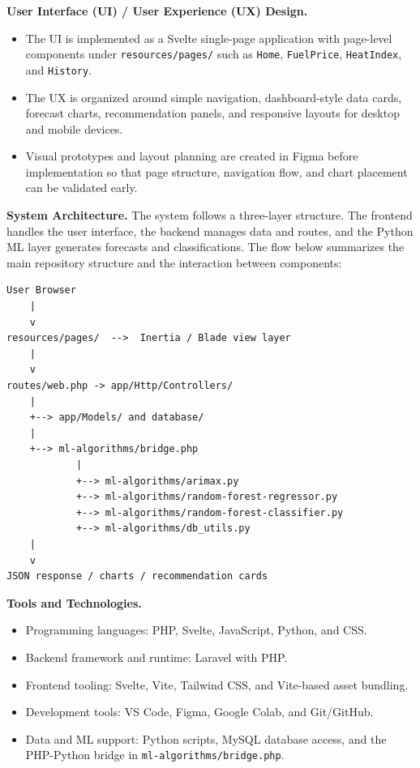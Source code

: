 \documentclass[12pt]{article}
\begin{document}
\medskip
\noindent\textbf{User Interface (UI) / User Experience (UX) Design.}
\begin{itemize}
    \item The UI is implemented as a Svelte single-page application with page-level components under \texttt{resources/pages/} such as \texttt{Home}, \texttt{FuelPrice}, \texttt{HeatIndex}, and \texttt{History}.
    \item The UX is organized around simple navigation, dashboard-style data cards, forecast charts, recommendation panels, and responsive layouts for desktop and mobile devices.
    \item Visual prototypes and layout planning are created in Figma before implementation so that page structure, navigation flow, and chart placement can be validated early.
\end{itemize}

\medskip
\noindent\textbf{System Architecture.} The system follows a three-layer structure. The frontend handles the user interface, the backend manages data and routes, and the Python ML layer generates forecasts and classifications. The flow below summarizes the main repository structure and the interaction between components:

\newpage
\begin{verbatim}
User Browser
    |
    v
resources/pages/  -->  Inertia / Blade view layer
    |
    v
routes/web.php -> app/Http/Controllers/
    |
    +--> app/Models/ and database/
    |
    +--> ml-algorithms/bridge.php
            |
            +--> ml-algorithms/arimax.py
            +--> ml-algorithms/random-forest-regressor.py
            +--> ml-algorithms/random-forest-classifier.py
            +--> ml-algorithms/db_utils.py
    |
    v
JSON response / charts / recommendation cards
\end{verbatim}

\medskip
\noindent\textbf{Tools and Technologies.}
\begin{itemize}
    \item Programming languages: PHP, Svelte, JavaScript, Python, and CSS.
    \item Backend framework and runtime: Laravel with PHP.
    \item Frontend tooling: Svelte, Vite, Tailwind CSS, and Vite-based asset bundling.
    \item Development tools: VS Code, Figma, Google Colab, and Git/GitHub.
    \item Data and ML support: Python scripts, MySQL database access, and the PHP-Python bridge in \texttt{ml-algorithms/bridge.php}.
\end{itemize}
\end{document}

